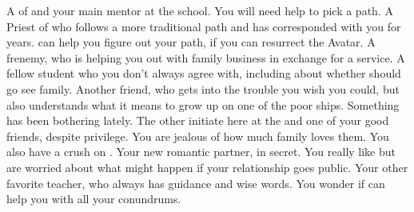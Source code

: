 \documentclass[char]{GL2020}
\begin{document}
\begin{contacts}
    \contact{\cFlowPriest{}} A \cFlowPriest{\cleric} of \cFlow{} and your main mentor at the school. You will need \cFlowPriest{\their} help to pick a path.
    \contact{\cEbbPriest{}} A Priest of \cEbb{} who follows a more traditional path and has corresponded with you for years. \cEbbPriest{\They} can help you figure out your path, if you can resurrect the Avatar.
    \contact{\cHeir{}} A frenemy, who is helping you out with family business in exchange for a service.
    \contact {\cPresident{}} A fellow student who you don’t always agree with, including about whether \cInitiate{} should go see \cInitiate{\their} family.
    \contact{\cPirateChild{}} Another friend, who gets into the trouble you wish you could, but also understands what it means to grow up on one of the poor ships. Something has been bothering \cPirateChild{} lately.
    \contact{\cInitiate{}} The other \pShippie{} initiate here at the \pSc{} and one of your good friends, despite \cInitiate{\their} privilege. You are jealous of how much \cInitiate{\their} family loves them. You also have a crush on \cInitiate{}.
    \contact{\cTechStar{}} Your new romantic partner, in secret. You really like \cTechStar{\them} but are worried about what might happen if your relationship goes public.
    \contact{\cEthics{}} Your other favorite teacher, who always has guidance and wise words.  You wonder if \cEthics{\they} can help you with all your conundrums.
\end{contacts}
\end{document}

